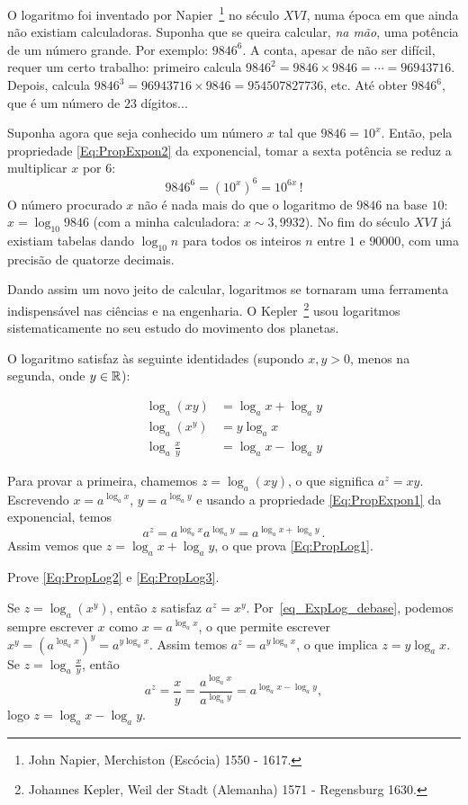 \begin{obs}
O logaritmo foi inventado por Napier~\footnote{John Napier, Merchiston (Escócia)
1550 - 1617.} no século $XVI$, numa época em que ainda não existiam
calculadoras. 
Suponha que se queira calcular, \emph{na mão}, uma potência de um número grande.
Por exemplo: $9846^6$. A conta, apesar de não ser difícil, requer um certo
trabalho: primeiro calcula $9846^2=9846\times 9846=\cdots=96943716$. Depois,
calcula $9846^3=96943716 \times 9846=954507827736$, etc. Até obter $9846^6$, que
é um número de $23$ dígitos...

Suponha agora que seja conhecido um número $x$ tal que $9846= 10^x$. Então, pela
propriedade \eqref{Eq:PropExpon2} 
da exponencial, tomar a sexta potência se reduz a multiplicar $x$ por $6$:
$$9846^6= (10^x)^6=10^{6x}\,!$$
O número procurado $x$ não é nada mais do que o logaritmo de $9846$ na  base
$10$: $x=\log_{10}9846$ (com a minha calculadora: $x\sim 3,9932$).
No fim do século $XVI$ já existiam tabelas dando $\log_{10}n$ para todos os
inteiros $n$ entre $1$ e $90000$, com uma precisão de quatorze decimais.

Dando assim um novo jeito de calcular, 
logaritmos se tornaram uma ferramenta indispensável nas ciências e na
engenharia. 
O Kepler~\footnote{Johannes Kepler, Weil der Stadt (Alemanha) 1571 - Regensburg
1630.} usou logaritmos sistematicamente no seu estudo do movimento
dos planetas.
\end{obs}

O logaritmo satisfaz às seguinte identidades (supondo $x,y>0$, menos na segunda,
onde $y\in \mathbb{R}$): 

\begin{align}
\log_a(xy)&=\log_ax+\log_ay\label{Eq:PropLog1}\\
\log_a(x^y)&=y\log_ax\label{Eq:PropLog2}\\
\log_a\tfrac{x}{y}&=\log_ax-\log_ay\label{Eq:PropLog3}
\end{align}

Para provar a primeira, chamemos $z=\log_a(xy)$, o que significa $a^z=xy$. 
Escrevendo $x=a^{\log_ax}$, $y=a^{\log_a y}$ e usando a propriedade
\eqref{Eq:PropExpon1} 
da exponencial, temos $$a^z=a^{\log_ax}a^{\log_a y}=a^{\log_ax+\log_a y}\,.$$ 
Assim vemos que $z=\log_ax+\log_a y$, o que prova \eqref{Eq:PropLog1}.

\begin{exo}
Prove \eqref{Eq:PropLog2} e \eqref{Eq:PropLog3}.
\begin{sol}
Se $z=\log_a(x^y)$, então $z$ satisfaz $a^z=x^y$.
Por~\eqref{eq_ExpLog_debase}, 
podemos sempre escrever $x$ como $x=a^{\log_a x}$, o que permite
escrever $x^y=(a^{\log_ax})^y=a^{y\log_a x}$. Assim temos $a^z=a^{y\log_a x}$, o que implica
$z=y\log_ax$.
Se $z=\log_a\frac{x}{y}$, então 
$$
a^z=\frac{x}{y}=\frac{a^{\log_ax}}{a^{\log_ay}}=a^{\log_ax-\log_ay},
$$
logo $z=\log_ax-\log_ay$.
\end{sol}
\end{exo}

